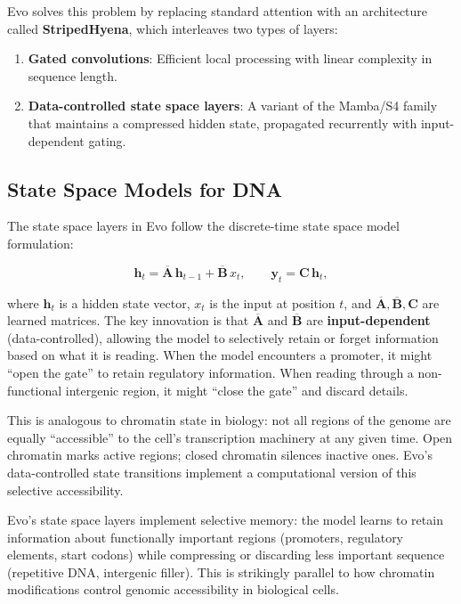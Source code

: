 Evo solves this problem by replacing standard attention with an architecture called \textbf{StripedHyena}, which interleaves two types of layers:

\begin{enumerate}[leftmargin=1.8em]
  \item \textbf{Gated convolutions}: Efficient local processing with linear complexity in sequence length.
  \item \textbf{Data-controlled state space layers}: A variant of the Mamba/S4 family that maintains a compressed hidden state, propagated recurrently with input-dependent gating.
\end{enumerate}

\subsection{State Space Models for DNA}

The state space layers in Evo follow the discrete-time state space model formulation:

\begin{equation}
\mathbf{h}_t = \overline{\mathbf{A}} \, \mathbf{h}_{t-1} + \overline{\mathbf{B}} \, x_t, \qquad \mathbf{y}_t = \mathbf{C} \, \mathbf{h}_t,
\label{eq:ssm-evo}
\end{equation}

where $\mathbf{h}_t$ is a hidden state vector, $x_t$ is the input at position $t$, and $\overline{\mathbf{A}}, \overline{\mathbf{B}}, \mathbf{C}$ are learned matrices. The key innovation is that $\overline{\mathbf{A}}$ and $\overline{\mathbf{B}}$ are \textbf{input-dependent} (data-controlled), allowing the model to selectively retain or forget information based on what it is reading. When the model encounters a promoter, it might ``open the gate'' to retain regulatory information. When reading through a non-functional intergenic region, it might ``close the gate'' and discard details.

This is analogous to chromatin state in biology: not all regions of the genome are equally ``accessible'' to the cell's transcription machinery at any given time. Open chromatin marks active regions; closed chromatin silences inactive ones. Evo's data-controlled state transitions implement a computational version of this selective accessibility.

\begin{bioinsight}
Evo's state space layers implement selective memory: the model learns to retain information about functionally important regions (promoters, regulatory elements, start codons) while compressing or discarding less important sequence (repetitive DNA, intergenic filler). This is strikingly parallel to how chromatin modifications control genomic accessibility in biological cells.
\end{bioinsight}

